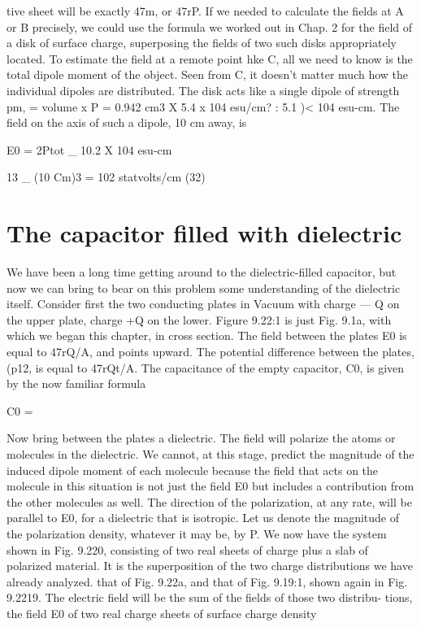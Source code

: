{%
tive sheet will be exactly 47m, or 47rP. If we needed to calculate the
fields at A or B precisely, we could use the formula we worked out
in Chap. 2 for the field of a disk of surface charge, superposing the
fields of two such disks appropriately located. To estimate the field
at a remote point hke C, all we need to know is the total dipole
moment of the object. Seen from C, it doesn't matter much how the
individual dipoles are distributed. The disk acts like a single dipole
of strength pm, = volume x P = 0.942 cm3 X 5.4 x 104 esu/cm? :
5.1 )< 104 esu-cm. The field on the axis of such a dipole, 10 cm
away, is

\begin{equation}
\end{equation}
E0 = 2Ptot _ 10.2 X 104 esu-cm

13 _ (10 Cm)3 = 102 statvolts/cm (32)

\section{The capacitor filled with dielectric}

We have been a long time getting around to the dielectric-filled
capacitor, but now we can bring to bear on this problem some understanding
of the dielectric itself. Consider first the two conducting
plates in Vacuum with charge  --- Q on the upper plate, charge +Q
on the lower. Figure 9.22:1 is just Fig. 9.1a, with which we began
this chapter, in cross section. The field between the plates E0 is
equal to 47rQ/A, and points upward. The potential difference between
the plates, (p12, is equal to 47rQt/A. The capacitance of the
empty capacitor, C0, is given by the now familiar formula

\begin{equation}
\end{equation}
C0 = %

Now bring between the plates a dielectric. The field will polarize
the atoms or molecules in the dielectric. We cannot, at this stage,
predict the magnitude of the induced dipole moment of each molecule
because the field that acts on the molecule in this situation is
not just the field E0 but includes a contribution from the other molecules
as well. The direction of the polarization, at any rate, will be
parallel to E0, for a dielectric that is isotropic. Let us denote the
magnitude of the polarization density, whatever it may be, by P.
We now have the system shown in Fig. 9.220, consisting of two real
sheets of charge plus a slab of polarized material. It is the superposition
of the two charge distributions we have already analyzed.
that of Fig. 9.22a, and that of Fig. 9.19:1, shown again in Fig. 9.2219.
The electric field will be the sum of the fields of those two distribu-
tions, the field E0 of two real charge sheets of surface charge density

}
